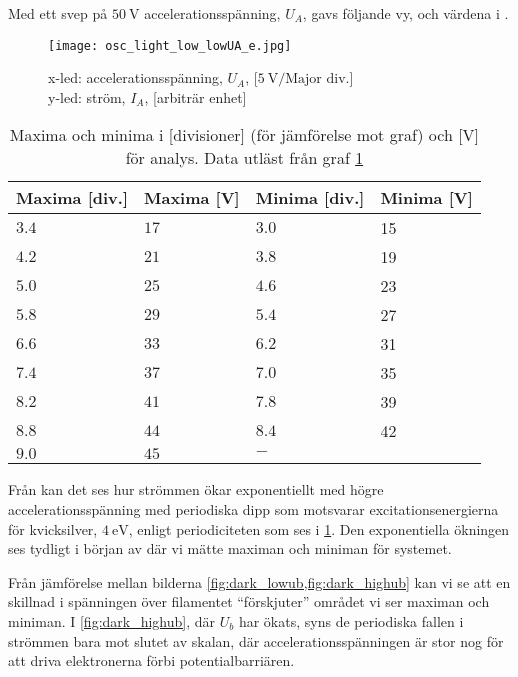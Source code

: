 Med ett svep på $50~\textrm{V}$ accelerationsspänning, $U_A$, gavs följande vy,  och värdena i .
\begin{figure}[h]
	\centering
	\texttt{[image: osc\_light\_low\_lowUA\_e.jpg]}
	\caption{x-led: accelerationsspänning, $U_A$, [$5~\textrm{V/Major div.}$]\\
			y-led: ström, $I_A$, [arbiträr enhet]}
	\label{fig:ollle}
\end{figure}

\begin{minipage}{\linewidth}
\begin{table}[H]
\centering
	\begin{tabular}{llll}
 	\textbf{Maxima [div.]}& \textbf{Maxima [V]}&\textbf{Minima [div.]}& \textbf{Minima [V]}\\\hline
	$3.4$&$17$&$3.0$&15\\
	$4.2$&$21$&$3.8$&19\\
	$5.0$&$25$&$4.6$&23\\
	$5.8$&$29$&$5.4$&27\\
	$6.6$&$33$&$6.2$&31\\
	$7.4$&$37$&$7.0$&35\\
	$8.2$&$41$&$7.8$&39\\
	$8.8$&$44$&$8.4$&42\\
	$9.0$&$45$&$ - $&
 	\end{tabular}
\caption{Maxima och minima i [divisioner] (för jämförelse mot graf) och [V] för analys. Data utläst från graf \cref{fig:ollle}}
\label{tab:maxmin}
\end{table}
\end{minipage}
\vspace{.5cm}

Från  kan det ses hur strömmen ökar exponentiellt med högre accelerationsspänning med periodiska dipp som motsvarar excitationsenergierna för kvicksilver, $4~\textrm{eV}$, enligt periodiciteten som ses i \cref{tab:maxmin}. Den exponentiella ökningen ses tydligt i början av  där vi mätte maximan och miniman för systemet.

Från jämförelse mellan bilderna \cref{fig:dark_lowub,fig:dark_highub} kan vi se att en skillnad i spänningen över filamentet ``förskjuter'' området vi ser maximan och miniman. I \cref{fig:dark_highub}, där $U_b$ har ökats, syns de periodiska fallen i strömmen bara mot slutet av skalan, där accelerationsspänningen är stor nog för att driva elektronerna förbi potentialbarriären. 

